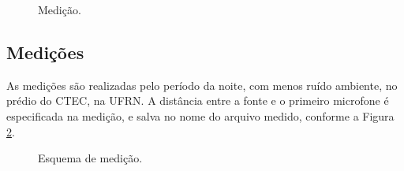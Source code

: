 \documentclass[a4paper,oneside,12pt]{article}
\begin{document}
\begin{figure}
\centering
{}
\caption{Medição.}\label{fig:medicao}
\end{figure}

\subsection{Medições}

As medições são realizadas pelo período da noite, com menos ruído ambiente, no prédio do CTEC, na UFRN. A distância entre a fonte e o primeiro microfone é especificada na medição, e salva no nome do arquivo medido, conforme a Figura \ref{fig:medicao_fonte}.

\begin{figure}
\centering
{}
\caption{Esquema de medição.}\label{fig:medicao_fonte}
\end{figure}
\end{document}
